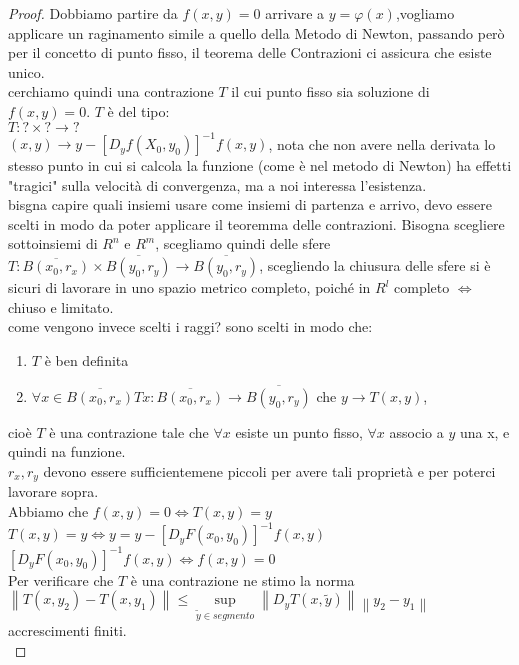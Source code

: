 \begin{proof}
	Dobbiamo partire da $f(x,y)=0$ arrivare a $y=\varphi(x)$,vogliamo applicare un raginamento simile a quello della Metodo di Newton, passando però per il concetto di punto fisso, il teorema delle Contrazioni ci assicura che esiste unico.\\
	cerchiamo quindi una contrazione $T$ il cui punto fisso sia soluzione di $f(x,y)=0$. $T$ è del tipo:\\
	$T:?\times ?\rightarrow ?$\\
	$(x,y)\rightarrow y-[D_yf(X_0,y_0)]^{-1}f(x,y)$, nota che non avere nella derivata lo stesso punto in cui si calcola la funzione (come è nel metodo di Newton) ha effetti "tragici" sulla velocità di convergenza, ma a noi interessa l'esistenza.\\
	bisgna capire quali insiemi usare come insiemi di partenza e arrivo, devo essere scelti in modo da poter applicare il teoremma delle contrazioni. Bisogna scegliere sottoinsiemi di $R^n$ e $R^m$, scegliamo quindi delle sfere\\
	$T:\overline{B(x_0,r_x)}\times\overline{B(y_0,r_y)}\rightarrow\overline{B(y_0,r_y)}$, scegliendo la chiusura delle sfere si è sicuri di lavorare in uno spazio metrico completo, poiché in $R^l$ completo $\Leftrightarrow$ chiuso e limitato.\\
	come vengono invece scelti i raggi? sono scelti in modo che:\\
	\begin{enumerate}
		\item $T$ è ben definita
		\item $\forall x \in \overline{B(x_0,r_x)} Tx: \overline{B(x_0,r_x)}\rightarrow\overline{B(y_0,r_y)}$ che $y\rightarrow T(x,y)$,\\
	\end{enumerate}
	cioè $T$ è una contrazione tale che $\forall x$ esiste un punto fisso, $\forall x$ associo a $y$ una x, e quindi na funzione.\\
	$r_x,r_y$ devono essere sufficientemene piccoli per avere tali proprietà e per poterci lavorare sopra.\\
	Abbiamo che $f(x,y)=0 \Leftrightarrow T(x,y)=y$\\
	$T(x,y)=y\Leftrightarrow y=y-[D_yF(x_0,y_0)]^{-1}f(x,y)$\\
	$[D_yF(x_0,y_0)]^{-1}f(x,y)\Leftrightarrow f(x,y)=0$\\
	Per verificare che $T$ è una contrazione ne stimo la norma\\
	$\left\| T(x,y_2)-T(x,y_1) \right\| \le \sup\limits_{\widetilde{y}\in segmento}\left\| D_yT(x,\widetilde{y})\right\|\left\| y_2-y_1 \right\| $  accrescimenti finiti.\\

\end{proof}
